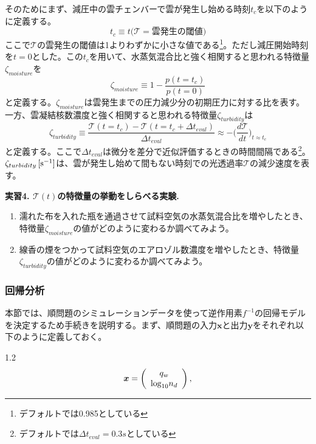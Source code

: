 \documentclass{jsarticle}
\begin{document}
そのためにまず、減圧中の雲チェンバーで雲が発生し始める時刻$t_{c}$を以下のように定義する。
\begin{equation}
t_{c} \equiv t {\big(} \mathcal{T} = 雲発生の閾値 {\big )}
\end{equation}
ここで$\mathcal{T}$の雲発生の閾値は1よりわずかに小さな値である\footnote{デフォルトでは0.985としている}。ただし減圧開始時刻を$t=0$とした。この$t_{c}$を用いて、水蒸気混合比と強く相関すると思われる特徴量$\zeta_{moisture}$を
\begin{equation}
\zeta_{moisture} \equiv 1 - \frac{p(t=t_{c})}{p(t=0)}
\end{equation}
と定義する。$\zeta_{moisture}$は雲発生までの圧力減少分の初期圧力に対する比を表す。一方、雲凝結核数濃度と強く相関すると思われる特徴量$\zeta_{turbidity}$は
\begin{equation}
\zeta_{turbidity} \equiv \frac{\mathcal{T}(t=t_{c})-\mathcal{T}(t=t_{c}+\Delta t_{eval})}{\Delta t_{eval}} \approx -{\bigg (}\frac{d\mathcal{T}}{dt}{\bigg )}_{t\approx t_{c}}
\end{equation}
と定義する。ここで$\Delta t_{eval}$は微分を差分で近似評価するときの時間間隔である\footnote{デフォルトでは$\Delta t_{eval}= 0.3s$としている}。 $\zeta_{turbidity} \, \rm[s^{-1}]$は、雲が発生し始めて間もない時刻での光透過率$\mathcal{T}$の減少速度を表す。
\\
\begin{itembox}[l]{\bf{実習4. $\mathcal{T}(t)$の特徴量の挙動をしらべる実験.}}
\begin{enumerate}
\item 濡れた布を入れた瓶を通過させて試料空気の水蒸気混合比を増やしたとき、特徴量$\zeta_{moisture}$の値がどのように変わるか調べてみよう。
\item 線香の煙をつかって試料空気のエアロゾル数濃度を増やしたとき、特徴量$\zeta_{turbidity}$の値がどのように変わるか調べてみよう。
\end{enumerate}
\end{itembox}

\subsubsection{回帰分析}
本節では、順問題のシミュレーションデータを使って逆作用素$f^{-1}$の回帰モデルを決定するため手続きを説明する。まず、順問題の入力$\bm{x}$と出力$\bm{y}$をそれぞれ以下のように定義しておく。
\begin{spacing}{1.2} 
\begin{equation}
\bm{x}= \left(
    \begin{array}{c}
      q_{w} \\
      {\rm log}_{10}n_d \\
    \end{array}
  \right),
\end{equation}
\end{spacing}
\end{document}
